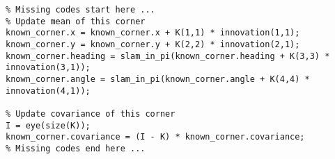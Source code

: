\begin{lstlisting}
% Missing codes start here ...
% Update mean of this corner 
known_corner.x = known_corner.x + K(1,1) * innovation(1,1);
known_corner.y = known_corner.y + K(2,2) * innovation(2,1);
known_corner.heading = slam_in_pi(known_corner.heading + K(3,3) * innovation(3,1));
known_corner.angle = slam_in_pi(known_corner.angle + K(4,4) * innovation(4,1));

% Update covariance of this corner
I = eye(size(K));
known_corner.covariance = (I - K) * known_corner.covariance;
% Missing codes end here ...
\end{lstlisting}
\label{fig:SLAMcrnrkf.}
